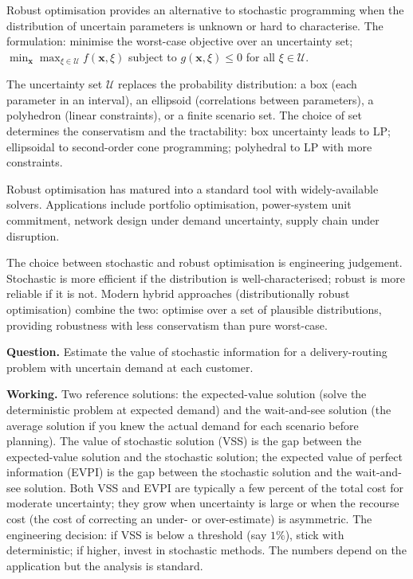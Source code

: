Robust optimisation provides an alternative to stochastic programming when the distribution of uncertain parameters is unknown or hard to characterise. The formulation: minimise the worst-case objective over an uncertainty set; $\min_{\mathbf{x}} \max_{\xi \in \mathcal{U}} f(\mathbf{x}, \xi)$ subject to $g(\mathbf{x}, \xi) \leq 0$ for all $\xi \in \mathcal{U}$.

The uncertainty set $\mathcal{U}$ replaces the probability distribution: a box (each parameter in an interval), an ellipsoid (correlations between parameters), a polyhedron (linear constraints), or a finite scenario set. The choice of set determines the conservatism and the tractability: box uncertainty leads to LP; ellipsoidal to second-order cone programming; polyhedral to LP with more constraints.

Robust optimisation has matured into a standard tool with widely-available solvers. Applications include portfolio optimisation, power-system unit commitment, network design under demand uncertainty, supply chain under disruption.

The choice between stochastic and robust optimisation is engineering judgement. Stochastic is more efficient if the distribution is well-characterised; robust is more reliable if it is not. Modern hybrid approaches (distributionally robust optimisation) combine the two: optimise over a set of plausible distributions, providing robustness with less conservatism than pure worst-case.

\begin{estimation}
\textbf{Question.} Estimate the value of stochastic information for a delivery-routing problem with uncertain demand at each customer.

\textbf{Working.} Two reference solutions: the expected-value solution (solve the deterministic problem at expected demand) and the wait-and-see solution (the average solution if you knew the actual demand for each scenario before planning). The value of stochastic solution (VSS) is the gap between the expected-value solution and the stochastic solution; the expected value of perfect information (EVPI) is the gap between the stochastic solution and the wait-and-see solution. Both VSS and EVPI are typically a few percent of the total cost for moderate uncertainty; they grow when uncertainty is large or when the recourse cost (the cost of correcting an under- or over-estimate) is asymmetric. The engineering decision: if VSS is below a threshold (say $1\%$), stick with deterministic; if higher, invest in stochastic methods. The numbers depend on the application but the analysis is standard.
\end{estimation}

